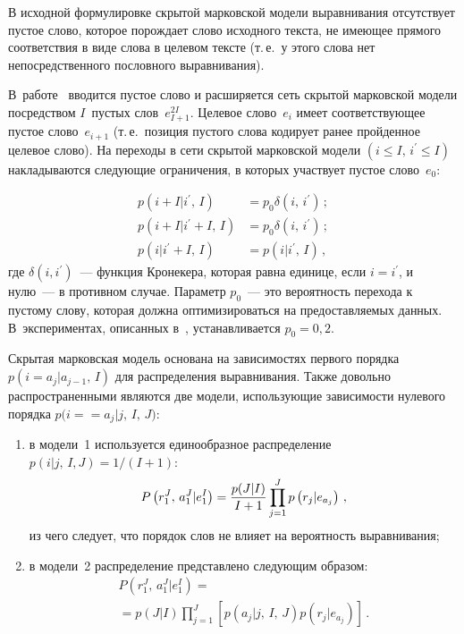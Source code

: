 \begin{multicols}{2}
     В исходной формулировке скрытой марковской модели выравнивания 
отсутствует пустое слово, которое порождает слово исходного текста, не 
име\-ющее прямого соответствия в виде слова в целевом тексте (т.\,е.\ у этого 
слова нет непосредственного пословного выравнивания). 

В~работе~\cite{18koz} вводится пустое слово и расширяется сеть скрытой 
марковской модели посредством $I$~пустых слов~$e^{2I}_{I+1}$. Целевое 
слово~$e_i$ имеет соответствующее пустое слово~$e_{i+1}$ (т.\,е.\ позиция 
пустого слова кодирует ранее пройденное целевое слово). На переходы в 
сети скрытой марковской модели $(i\leq I,\,i^\prime\leq I)$ накладываются 
следующие ограничения, в которых участвует пустое 
слово~$e_0$:

\noindent
     \begin{align*}
     p\left( i+I\vert i^\prime,\,I\right) & 
=p_0\delta\left(i,\,i^\prime\right)\,;\\
     p\left( i+I\vert i^\prime+I,\,I\right) & 
=p_0\delta\left(i,\,i^\prime\right)\,;\\
     p\left( i\vert i^\prime+I,\,I\right) & =p\left(i\vert 
i^\prime,\,I\right)\,,
     \end{align*}
где $\delta (i,i^\prime)$~--- функция Кронекера, которая равна 
единице, если $i=i^\prime$, и нулю~--- в противном случае.
Параметр $p_0$~--- это вероятность перехода к пустому слову, которая 
должна оптимизироваться на предоставляемых данных. В~экспериментах, 
описанных в~\cite{18koz}, устанавливается $p_0=0{,}2$.
     
     Скрытая марковская модель основана на зависимостях первого порядка 
$p(i=a_j\vert a_{j-1},\,I)$ для распределения выравнивания. Также довольно 
распространенными являются две модели, использующие зависимости 
нулевого порядка $p(i=$\linebreak $=a_j\vert j,\,I,\,J)$:
     \begin{enumerate}[(1)]
\item в модели~1 используется единообразное распределение $p(i\vert 
j,\,I,J)=1/(I+1)$:
\begin{equation*}
P\left( r_1^J,\,a_1^J\vert e_1^I\right) = \displaystyle\frac{\displaystyle p(J\vert 
I)\mathstrut}{\displaystyle I+1\mathstrut}\prod\limits_{j=1}^J p\left(r_j\vert e_{a_j}\right)\,,
\end{equation*}
из чего следует, что порядок слов не влияет на вероятность выравнивания;
\item в модели~2 распределение представлено следующим образом:
\begin{multline*}
P\left( r_1^J,\,a_1^J\vert e_1^I\right) ={}\\
{}=p(J\vert I)\prod\limits_{j=1}^J\left[ 
p\left(a_j\vert j,\,I,\,J\right) p \left(r_j\vert e_{a_j}\right)\right]\,.
\end{multline*}
      

\end{enumerate}
\end{multicols}
